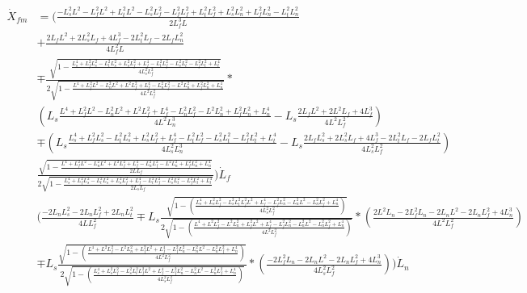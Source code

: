 \documentclass[11pt, landscape]{article}
\begin{document}
\begin{align}
  \dot{X}_{fm} &= \Bigg(\frac{-L_s^2L^2 - L_f^2L^2 + L_t^2L^2 - L_s^2L_f^2 - L_f^2L_f^2 + L_t^2L_f^2 + L_s^2L_n^2 + L_f^2L_n^2 - L_t^2L_n^2}{{2L_f^{3}L}}\\
  &+ \frac{2L_fL^2 + 2L_s^2L_f + 4L_f^3 - 2L_t^2L_f - 2L_fL_n^2}{4L_f^2L}\\
  &\mp \frac{\sqrt{1-\frac{L_{s}^4 + L_f^2L_{s}^2 - L_t^2L_{s}^2 + L_s^2L_f^2 + L_f^4 - L_t^2L_f^2 - L_s^2L_{t}^2 - L_f^2L_{t}^2 + L_{t}^4}{4L_{s}^2L_f^2}}}{2\sqrt{1-\frac{L^4 + L_f^2L^2 - L_n^2L^2 + L^2L_f^2 + L_f^4 - L_n^2L_f^2 - L^2L_n^2 + L_f^2L_n^2 + L_n^4}{4L^2L_f^2}}}*\\
  &\left(L_s\frac{L^4 + L_f^2L^2 - L_n^2L^2 + L^2L_f^2 + L_f^4 - L_n^2L_f^2 - L^2L_n^2 + L_f^2L_n^2 + L_n^4}{4L^2L^3_{n}} - L_s\frac{2L_fL^2 + 2L^2L_f + 4L_f^3}{4L^2L_f^2}\right)\\
  &\mp \left(L_s\frac{L_{s}^4 + L_f^2L_{s}^2 - L_t^2L_{s}^2 + L_s^2L_f^2 + L_f^4 - L_t^2L_f^2 - L_s^2L_{t}^2 - L_f^2L_{t}^2 + L_{t}^4}{4L_{s}^2L^3_{n}}
    - L_s\frac{2L_fL_{s}^2 + 2L_s^2L_f + 4L_f^3 - 2L_t^2L_f - 2L_fL_{t}^2}{4L_{s}^2L_f^2}\right)\\
  &\frac{\sqrt{1-\frac{L^4 + L_f^2L^2 - L_n^2L^2 + L^2L_f^2 + L_f^4 - L_n^2L_f^2 - L^2L_n^2 + L_f^2L_n^2 + L_n^4}{2LL_f}}}{2\sqrt{1-\frac{L_{s}^4 + L_f^2L_{s}^2 - L_t^2L_{s}^2 + L_s^2L_f^2 + L_f^4 - L_t^2L_f^2 - L_s^2L_{t}^2 - L_f^2L_{t}^2 + L_{t}^4}{2L_{s}L_f}}}\Bigg)\dot{L}_f\\
  &\Bigg(\frac{-2L_nL_s^2 - 2L_nL_f^2 + 2L_nL_t^2}{4LL_f^2}
  \mp L_s\frac{\sqrt{1-\left(\frac{L_s^4 + L_s^2L_f^2 - L_s^2L_t^2 L_f^2L^2 + L_f^4 - L_f^2L_n^2 - L_n^2L^2 - L_n^2L_f^2 + L_n^4}{4L_{s}^2L_f^2}\right)}}{2\sqrt{1 - \left(\frac{L^4 + L^2L_f^2 - L^2L_n^2 + L_f^2L^2 + L_f^4 - L_f^2L_n^2 - L_n^2L^2 - L_n^2L_f^2 + L_n^4}{4L^2L_f^2}\right)}}
  *\left(\frac{2L^2L_n - 2L_f^2L_n - 2L_nL^2 - 2L_nL_f^2 + 4L_n^3}{4L^2L_f^2}\right)\\
  &\mp L_s\frac{\sqrt{1 - \left(\frac{L^4 + L^2L_f^2 - L^2L_n^2 + L_f^2L^2 + L_f^4 - L_f^2L_n^2 - L_n^2L^2 - L_n^2L_f^2 + L_n^4}{4L^2L_f^2}\right)}}{2\sqrt{1-\left(\frac{L_s^4 + L_s^2L_f^2 - L_s^2L_t^2 L_f^2L^2 + L_f^4 - L_f^2L_n^2 - L_n^2L^2 - L_n^2L_f^2 + L_n^4}{4L_{s}^2L_f^2}\right)}}
  *\left(\frac{-2L_f^2L_n - 2L_nL^2 - 2L_nL_f^2 + 4L_n^3}{4L_{s}^2L_f^2}\right)\Bigg)\dot{L}_n\\
\end{align}
\end{document}
